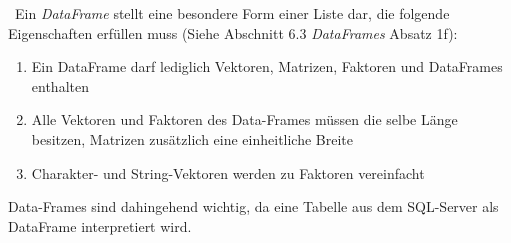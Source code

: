 ~\newline Ein \textit{DataFrame} stellt eine besondere Form einer Liste dar, die folgende Eigenschaften erfüllen muss (Siehe \cite{RIntro} Abschnitt 6.3 \textit{DataFrames} Absatz 1f): 
\begin{enumerate}
	\item Ein DataFrame darf lediglich Vektoren, Matrizen, Faktoren und DataFrames enthalten
	\item Alle Vektoren und Faktoren des Data-Frames müssen die selbe Länge besitzen, Matrizen zusätzlich eine einheitliche Breite
	\item Charakter- und String-Vektoren werden zu Faktoren vereinfacht
\end{enumerate} 
Data-Frames sind dahingehend wichtig, da eine Tabelle aus dem SQL-Server als DataFrame interpretiert wird. 
